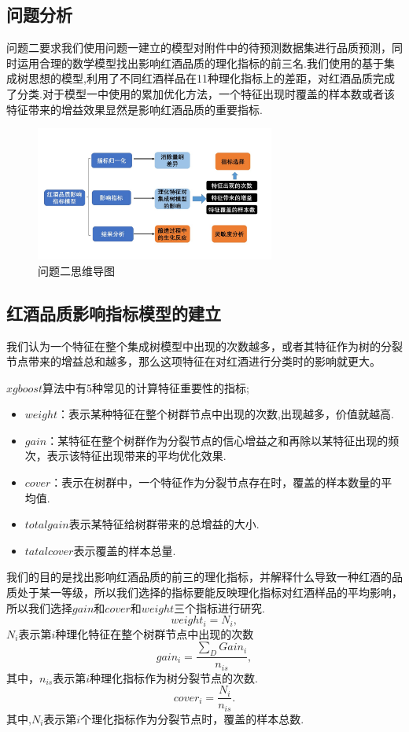 \documentclass{whutmod}
\begin{document}
\subsection{问题分析}
问题二要求我们使用问题一建立的模型对附件中的待预测数据集进行品质预测，同时运用合理的数学模型找出影响红酒品质的理化指标的前三名.我们使用的基于集成树思想的模型,利用了不同红酒样品在11种理化指标上的差距，对红酒品质完成了分类.对于模型一中使用的累加优化方法，一个特征出现时覆盖的样本数或者该特征带来的增益效果显然是影响红酒品质的重要指标.
\begin{figure}[!h]
	\centering
	\includegraphics[width=0.7\textwidth]{map2.jpg}
	\caption{问题二思维导图}
\end{figure}
\subsection{红酒品质影响指标模型的建立}
我们认为一个特征在整个集成树模型中出现的次数越多，或者其特征作为树的分裂节点带来的增益总和越多，那么这项特征在对红酒进行分类时的影响就更大。

$xgboost$算法中有5种常见的计算特征重要性的指标;
\begin{itemize}
	\item{$weight$}：表示某种特征在整个树群节点中出现的次数,出现越多，价值就越高.
	
	\item{$gain$}：某特征在整个树群作为分裂节点的信心增益之和再除以某特征出现的频次，表示该特征出现带来的平均优化效果.
	
	\item{$cover$}：表示在树群中，一个特征作为分裂节点存在时，覆盖的样本数量的平均值.
	
	\item{$total gain$}表示某特征给树群带来的总增益的大小.
	
	\item{$tatal cover$}表示覆盖的样本总量.
\end{itemize}
我们的目的是找出影响红酒品质的前三的理化指标，并解释什么导致一种红酒的品质处于某一等级，所以我们选择的指标要能反映理化指标对红酒样品的平均影响，所以我们选择$gain$和$cover$和$weight$三个指标进行研究.
\begin{equation}
weight_{i}=N_{i},
\end{equation}
$N_{i}$表示第$i$种理化特征在整个树群节点中出现的次数
\begin{equation}
gain_{i}=\frac{\sum_{D}{Gain_{i}}}{n_{is}},
\end{equation}
其中，$n_{is}$表示第$i$种理化指标作为树分裂节点的次数.
\begin{equation}
cover_{i}=\frac{N_{i}}{n_{is}}.
\end{equation}
其中,$N_{i}$表示第$i$个理化指标作为分裂节点时，覆盖的样本总数.
\end{document}
